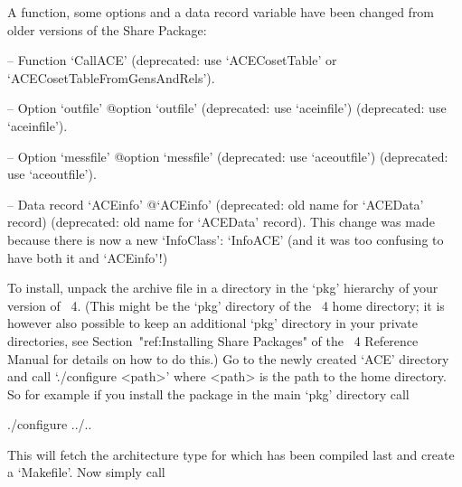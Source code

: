 A function, some options and a data record variable have been changed
from older versions of the {\ACE} Share Package:

\beginlist

\item{--} Function   `CallACE'{\undoquotes{}}  (deprecated:  use
`ACECosetTable' or `ACECosetTableFromGensAndRels').

\item{--} Option    `outfile'{\undoquotes{}
{@option `outfile' (deprecated: use  `aceinfile')}}  (deprecated:  use
`aceinfile').

\item{--} Option    `messfile'{\undoquotes{}
{@option `messfile' (deprecated: use `aceoutfile')}} (deprecated:  use
`aceoutfile').

\item{--} Data      record      `ACEinfo'{\undoquotes{}
{@`ACEinfo' (deprecated: old name for `ACEData' record)}} (deprecated:
old name for `ACEData' record). This change was made because there  is
now a new `InfoClass': `InfoACE' (and it was  too  confusing  to  have
both it and `ACEinfo'!)

\endlist



To  install, unpack  the  archive file  in  a directory  in the  `pkg'
hierarchy  of your  version  of  {\GAP}~4. (This  might  be the  `pkg'
directory of the {\GAP}~4 home  directory; it is however also possible
to keep an additional `pkg' directory in your private directories, see
Section~"ref:Installing  Share Packages"  of  the {\GAP}~4   Reference
Manual for details  on how to do this.) Go to  the newly created `ACE'
directory and  call `./configure <path>'  where <path> is the  path to
the {\GAP} home  directory. So for example if  you install the package
in the main `pkg' directory call

\begintt
./configure ../..
\endtt

This  will fetch  the  architecture  type for  which  {\GAP} has  been
compiled last and create a `Makefile'. Now simply call

